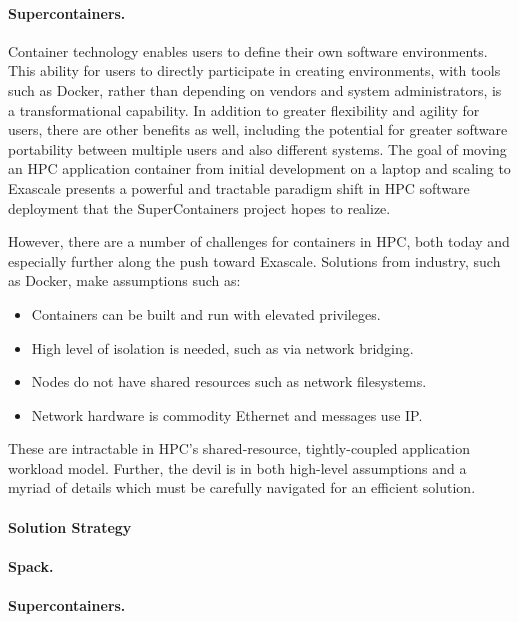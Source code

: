\paragraph{Supercontainers.}
Container technology enables users to define their own software environments. This ability for users to directly participate in creating environments, with tools such as Docker, rather than depending on vendors and system administrators, is a transformational capability.
In addition to greater flexibility and agility for users, there are other benefits as well, including the potential for greater software portability between multiple users and also different systems. The goal of moving an HPC application container from initial development on a laptop and scaling to Exascale presents a powerful and tractable paradigm shift in HPC software deployment that the SuperContainers project hopes to realize.

However, there are a number of challenges for containers in HPC, both today and especially further along the push toward Exascale. Solutions from industry, such as Docker, make assumptions such as:

\begin{itemize}
	\item	Containers can be built and run with elevated privileges.
	\item	High level of isolation is needed, such as via network bridging.
	\item	Nodes do not have shared resources such as network filesystems.
	\item	Network hardware is commodity Ethernet and messages use IP.
\end{itemize}

These are intractable in HPC’s shared-resource, tightly-coupled application workload model. Further, the devil is in both high-level assumptions and a myriad of details which must be carefully navigated for an efficient solution.



\paragraph{Solution Strategy}


\paragraph{Spack.}

\paragraph{Supercontainers.}

